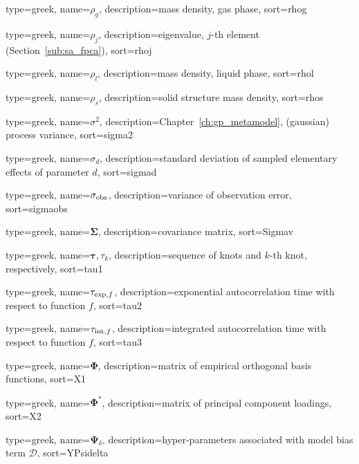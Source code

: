 {
  type=greek,
	name={\ensuremath{\rho_g}},
	description={mass density, gas phase},
	sort={rhog}
}

{
  type=greek,
	name={\ensuremath{\rho_{j}}},
	description={eigenvalue, $j$-th element (Section~\ref{sub:sa_fpca})},
	sort={rhoj}
}

{
  type=greek,
	name={\ensuremath{\rho_l}},
	description={mass density, liquid phase},
	sort={rhol}
}

{
  type=greek,
	name={\ensuremath{\rho_{s}}},
	description={solid structure mass density},
	sort={rhos}
}

{
  type=greek,
	name={\ensuremath{\sigma^2}},
	description={Chapter~\ref{ch:gp_metamodel}, (gaussian) process variance},
	sort={sigma2}
}

{
  type=greek,
	name={\ensuremath{\sigma_d}},
	description={standard deviation of sampled elementary effects of parameter $d$},
	sort={sigmad}
}

{
  type=greek,
	name={\ensuremath{\sigma_\textnormal{obs}}},
	description={variance of observation error},
	sort={sigmaobs}
}

{
  type=greek,
	name={\ensuremath{\bm{\Sigma}}},
	description={covariance matrix},
	sort={Sigmav}
}

{
  type=greek,
	name={\ensuremath{\bm{\tau}, \tau_k}},
	description={sequence of knots and $k$-th knot, respectively},
	sort={tau1}
}

{
  type=greek,
	name={\ensuremath{\tau_{\textnormal{exp},f}}},
	description={exponential autocorrelation time with respect to function $f$},
	sort={tau2}
}

{
  type=greek,
	name={\ensuremath{\tau_{\textnormal{int},f}}},
	description={integrated autocorrelation time with respect to function $f$},
	sort={tau3}
}

{
  type=greek,
	name={\ensuremath{\bm{\Phi}}},
	description={matrix of empirical orthogonal basis functions},
	sort={X1}
}

{
  type=greek,
	name={\ensuremath{\bm{\Phi}^*}},
	description={matrix of principal component loadings},
	sort={X2}
}

{
  type=greek,
	name={\ensuremath{\bm{\Psi}_\delta}},
	description={hyper-parameters associated with model bias term $\mathcal{D}$},
	sort={YPsidelta}
}

